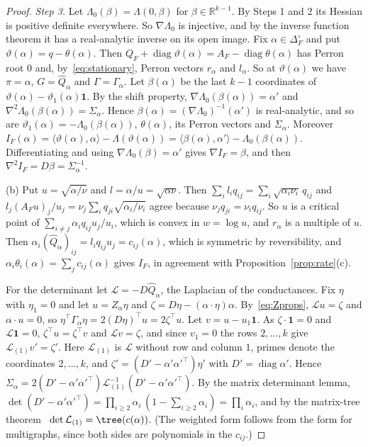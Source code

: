 \begin{proof}
\emph{Step 3.} Let $\Lambda_0(\beta)=\Lambda(0,\beta)$ for
$\beta\in\mathbb R^{k-1}$. By Steps 1 and 2 its Hessian is positive definite
everywhere. So $\nabla\Lambda_0$ is injective, and by the inverse function
theorem it has a real-analytic inverse on its open image. Fix
$\alpha\in\Delta_F^\circ$ and put $\vartheta(\alpha)=q-\theta(\alpha)$. Then
$Q_F+\operatorname{diag}\vartheta(\alpha)=A_F-\operatorname{diag}\theta(\alpha)$
has Perron root $0$ and, by~\eqref{eq:stationary}, Perron vectors $r_\alpha$
and $l_\alpha$. So at $\vartheta(\alpha)$ we have $\pi=\alpha$,
$G=\widehat Q_\alpha$ and $\Gamma=\Gamma_\alpha$. Let $\beta(\alpha)$ be the
last $k-1$ coordinates of $\vartheta(\alpha)-\vartheta_1(\alpha)\mathbf 1$.
By the shift property, $\nabla\Lambda_0(\beta(\alpha))=\alpha'$ and
$\nabla^2\Lambda_0(\beta(\alpha))=\Sigma_\alpha$. Hence
$\beta(\alpha)=(\nabla\Lambda_0)^{-1}(\alpha')$ is real-analytic, and so are
$\vartheta_1(\alpha)=-\Lambda_0(\beta(\alpha))$, $\theta(\alpha)$, its Perron
vectors and $\Sigma_\alpha$. Moreover
$I_F(\alpha)=\langle\vartheta(\alpha),\alpha\rangle-\Lambda(\vartheta(\alpha))
=\langle\beta(\alpha),\alpha'\rangle-\Lambda_0(\beta(\alpha))$. Differentiating
and using $\nabla\Lambda_0(\beta)=\alpha'$ gives $\nabla I_F=\beta$, and then
$\nabla^2I_F=D\beta=\Sigma_\alpha^{-1}$.

(b) Put $u=\sqrt{\alpha/\nu}$ and $l=\alpha/u=\sqrt{\alpha\nu}$. Then
$\sum_il_iq_{ij}=\sum_i\sqrt{\alpha_i\nu_i}\,q_{ij}$ and
$l_j(A_Fu)_j/u_j=\nu_j\sum_iq_{ji}\sqrt{\alpha_i/\nu_i}$ agree because
$\nu_jq_{ji}=\nu_iq_{ij}$. So $u$ is a critical point of
$\sum_{i\ne j}\alpha_iq_{ij}u_j/u_i$, which is convex in $w=\log u$, and
$r_\alpha$ is a multiple of $u$. Then
$\alpha_i(\widehat Q_\alpha)_{ij}=l_iq_{ij}u_j=c_{ij}(\alpha)$, which is
symmetric by reversibility, and $\alpha_i\theta_i(\alpha)=\sum_jc_{ij}(\alpha)$
gives $I_F$, in agreement with Proposition~\ref{prop:rate}(c).

For the determinant let $\mathcal L=-D\widehat Q_\alpha$, the Laplacian of the
conductances. Fix $\eta$ with $\eta_1=0$ and let $u=Z_\alpha\eta$ and
$\zeta=D\eta-(\alpha\cdot\eta)\alpha$. By~\eqref{eq:Zprops},
$\mathcal Lu=\zeta$ and $\alpha\cdot u=0$, so
$\eta^\top\Gamma_\alpha\eta=2(D\eta)^\top u=2\zeta^\top u$. Let
$v=u-u_1\mathbf 1$. As $\zeta\cdot\mathbf 1=0$ and $\mathcal L\mathbf 1=0$,
$\zeta^\top u=\zeta^\top v$ and $\mathcal Lv=\zeta$, and since $v_1=0$ the
rows $2,\dots,k$ give $\mathcal L_{(1)}v'=\zeta'$. Here $\mathcal L_{(1)}$ is
$\mathcal L$ without row and column $1$, primes denote the coordinates
$2,\dots,k$, and $\zeta'=(D'-\alpha'\alpha'^\top)\eta'$ with
$D'=\operatorname{diag}\alpha'$. Hence
$\Sigma_\alpha=2(D'-\alpha'\alpha'^\top)\mathcal L_{(1)}^{-1}(D'-\alpha'\alpha'^\top)$.
By the matrix determinant lemma,
$\det(D'-\alpha'\alpha'^\top)=\prod_{i\ge2}\alpha_i\,(1-\sum_{i\ge2}\alpha_i)
=\prod_i\alpha_i$, and by the matrix-tree theorem~\cite{bollobas1998}
$\det\mathcal L_{(1)}=\tree(c(\alpha))$. (The weighted form follows from the
form for multigraphs, since both sides are polynomials in the $c_{ij}$.)
\end{proof}

